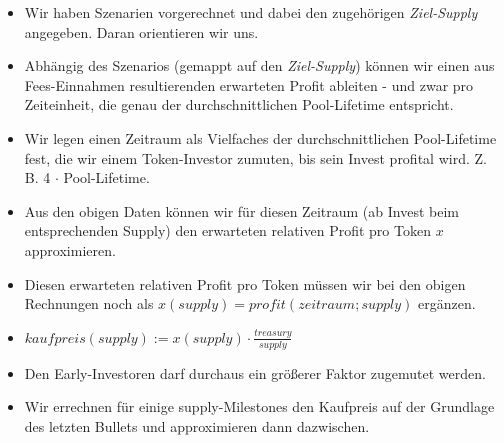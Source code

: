 \vspace{0.5cm}



\begin{Algo}

\begin{itemize}
	\item Wir haben Szenarien vorgerechnet und dabei den zugehörigen \textit{Ziel-Supply} angegeben. Daran orientieren wir uns.
	\item Abhängig des Szenarios (gemappt auf den \textit{Ziel-Supply}) können wir einen aus Fees-Einnahmen resultierenden erwarteten Profit ableiten - und zwar pro Zeiteinheit, die genau der durchschnittlichen Pool-Lifetime entspricht.
	\item Wir legen einen Zeitraum als Vielfaches der durchschnittlichen Pool-Lifetime fest, die wir einem Token-Investor zumuten, bis sein Invest profital wird. Z. B. 4 $\cdot$ Pool-Lifetime.
	\item Aus den obigen Daten können wir für diesen Zeitraum (ab Invest beim entsprechenden Supply) den erwarteten relativen Profit pro Token $x$ approximieren.
	\item Diesen erwarteten relativen Profit pro Token müssen wir bei den obigen Rechnungen noch als $x(supply) = profit(zeitraum; supply)$ ergänzen.
	\item $kaufpreis(supply) := x(supply) \cdot \frac{treasury}{supply}$
	\item Den Early-Investoren darf durchaus ein größerer Faktor zugemutet werden.
	\item Wir errechnen für einige supply-Milestones den Kaufpreis auf der Grundlage des letzten Bullets und approximieren dann dazwischen.
\end{itemize}

\end{Algo}



\vspace{1.0cm}


\vspace{0.3cm}

